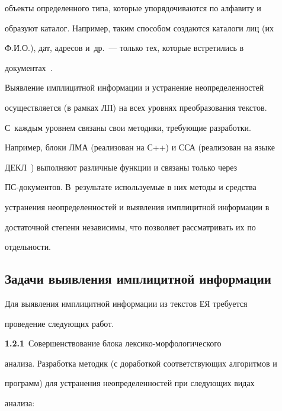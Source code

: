 объекты определенного типа, которые упорядочиваются по алфавиту и 


образуют каталог. Например, таким способом создаются каталоги лиц (их 


Ф.И.О.), дат, адресов и~др.~--- только тех, которые встретились в 


документах~\cite{5-2-9}.





Выявление имплицитной информации и устранение неопределенностей 


осуществляется (в рамках ЛП) на всех уровнях преобразования текстов. 


С~каждым уровнем связаны свои методики, требующие разработки. 


Например, блоки ЛМА (реализован на С++) и ССА (реализован на языке 


ДЕКЛ~\cite{6-2-9}) выполняют различные функции и связаны только через 


ПС-документов.  В~результате используемые в них методы и средства 


устранения неопределенностей и выявления имплицитной информации в 


достаточной степени независимы, что позволяет рассматривать их по 


отдельности. 





   \subsection{Задачи выявления имплицитной информации}


      


   Для выявления имплицитной информации из текстов ЕЯ требуется 


проведение следующих работ.


   


   \textbf{1.2.1}\ Совершенствование блока лексико-морфологического 


анализа. Разработка методик (с доработкой соответствующих алгоритмов и 


программ)  для устранения неопределенностей при следующих видах 


анализа:


